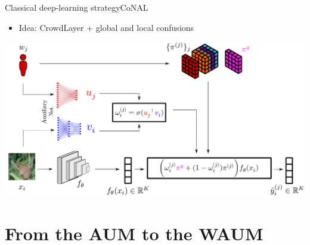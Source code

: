\begin{frame}{Classical deep-learning strategy}{CoNAL}
    \begin{itemize}
        \item Idea: CrowdLayer + global and local confusions
    \end{itemize}
    \begin{center}
        \includegraphics[width=\textwidth]{./images/conal_scheme.pdf}
    \end{center}

\end{frame}

\section{From the AUM to the WAUM}

